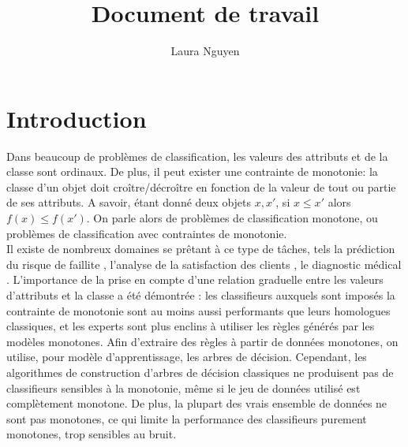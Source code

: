\documentclass[a4paper]{article}
\title{Document de travail}
\author{Laura Nguyen}
\begin{document}
\maketitle

\section{Introduction}
    Dans beaucoup de problèmes de classification, les valeurs des attributs et de la classe sont ordinaux. De plus, il peut exister une contrainte de monotonie: la classe d'un objet doit croître/décroître en fonction de la valeur de tout ou partie de ses attributs. A savoir, étant donné deux objets $x, x'$, si $x \leq x'$ alors $f(x) \leq f(x')$. On parle alors de problèmes de classification monotone, ou problèmes de classification avec contraintes de monotonie. \\
Il existe de nombreux domaines se prêtant à ce type de tâches, tels la prédiction du risque de faillite \cite{greco-new-bankruptcy}, l'analyse de la satisfaction des clients \cite{greco-customer}, le diagnostic médical \cite{marsala-gradual}. 
L'importance de la prise en compte d'une relation graduelle entre les valeurs d'attributs et la classe a été démontrée \cite{pazzani-acceptance}: les classifieurs auxquels sont imposés la contrainte de monotonie sont au moins aussi performants que leurs homologues classiques, et les experts sont plus enclins à utiliser les règles générés par les modèles monotones.
Afin d'extraire des règles à partir de données monotones, on utilise, pour modèle d'apprentissage, les arbres de décision. Cependant, les algorithmes de construction d'arbres de décision classiques ne produisent pas de classifieurs sensibles à la monotonie, même si le jeu de données utilisé est complètement monotone. De plus, la plupart des vrais ensemble de données ne sont pas monotones, ce qui limite la performance des classifieurs purement monotones, trop sensibles au bruit. \\

\printbibliography
\end{document}
